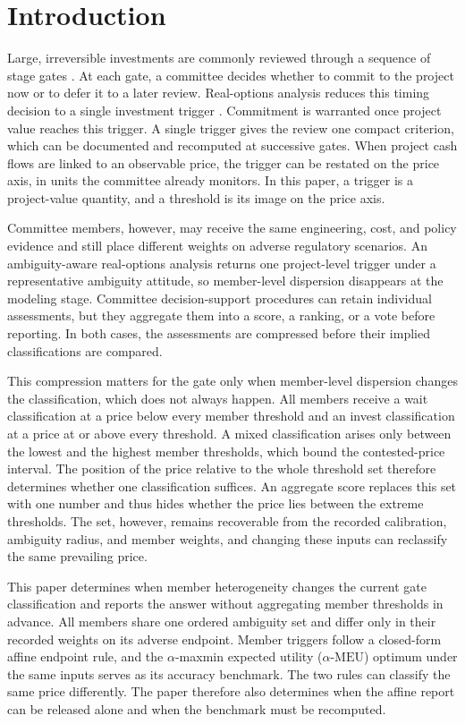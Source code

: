 \documentclass[5p,times,authoryear]{elsarticle}
\theoremstyle{plain}
\newcommand{\aMEU}{\alpha\text{-MEU}}
\begin{document}
\section{Introduction}

Large, irreversible investments are commonly reviewed through a sequence of stage gates \citep{Cooper2008}. At each gate, a committee decides whether to commit to the project now or to defer it to a later review. Real-options analysis reduces this timing decision to a single investment trigger \citep{McDonaldSiegel1986,DixitPindyck1994}. Commitment is warranted once project value reaches this trigger. A single trigger gives the review one compact criterion, which can be documented and recomputed at successive gates. When project cash flows are linked to an observable price, the trigger can be restated on the price axis, in units the committee already monitors. In this paper, a trigger is a project-value quantity, and a threshold is its image on the price axis.

Committee members, however, may receive the same engineering, cost, and policy evidence and still place different weights on adverse regulatory scenarios. An ambiguity-aware real-options analysis returns one project-level trigger under a representative ambiguity attitude, so member-level dispersion disappears at the modeling stage. Committee decision-support procedures can retain individual assessments, but they aggregate them into a score, a ranking, or a vote before reporting. In both cases, the assessments are compressed before their implied classifications are compared.

This compression matters for the gate only when member-level dispersion changes the classification, which does not always happen. All members receive a wait classification at a price below every member threshold and an invest classification at a price at or above every threshold. A mixed classification arises only between the lowest and the highest member thresholds, which bound the contested-price interval. The position of the price relative to the whole threshold set therefore determines whether one classification suffices. An aggregate score replaces this set with one number and thus hides whether the price lies between the extreme thresholds. The set, however, remains recoverable from the recorded calibration, ambiguity radius, and member weights, and changing these inputs can reclassify the same prevailing price.

This paper determines when member heterogeneity changes the current gate classification and reports the answer without aggregating member thresholds in advance. All members share one ordered ambiguity set and differ only in their recorded weights on its adverse endpoint. Member triggers follow a closed-form affine endpoint rule, and the $\alpha$-maxmin expected utility ($\aMEU$) optimum under the same inputs serves as its accuracy benchmark. The two rules can classify the same price differently. The paper therefore also determines when the affine report can be released alone and when the benchmark must be recomputed.
\end{document}
